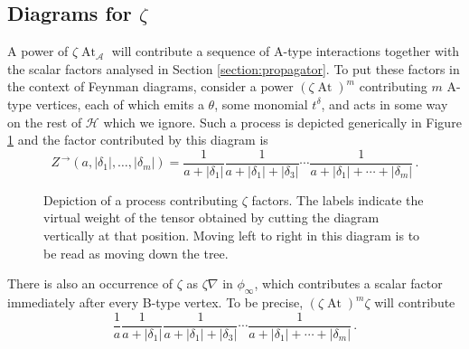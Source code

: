 \documentclass[english,letter paper,12pt,leqno]{article}
\theoremstyle{example}
\numberwithin{equation}{section}
\def\AA{\mathcal{A}}
\def\HH{\HH}
\def\HH{\mathcal{H}}
\def\be{\begin{equation}}
\def\ee{\end{equation}}
\DeclareMathOperator{\vAt}{At}
\begin{document}
\subsection{Diagrams for $\zeta$}\label{section:fenyman_diagram_2}

A power of $\zeta \vAt_{\AA}$ will contribute a sequence of A-type interactions together with the scalar factors analysed in Section \ref{section:propagator}. To put these factors in the context of Feynman diagrams, consider a power $(\zeta \vAt)^m$ contributing $m$ A-type vertices, each of which emits a $\theta$, some monomial $t^\delta$, and acts in some way on the rest of $\HH$ which we ignore. Such a process is depicted generically in Figure \ref{fig:tapesofU} and the factor contributed by this diagram is
\be\label{eq:diagram_for_zeta_eq}
Z^{\,\rightarrow}(a,|\delta_1|,\ldots,|\delta_m|) = \frac{1}{a + |\delta_1|} \frac{1}{a + |\delta_1| + |\delta_3|} \cdots \frac{1}{a + |\delta_1| + \cdots + |\delta_m|}\,.
\ee
\begin{figure}
\centering
\caption{Depiction of a process contributing $\zeta$ factors. The labels indicate the virtual weight of the tensor obtained by cutting the diagram vertically at that position. Moving left to right in this diagram is to be read as moving down the tree.}\label{fig:tapesofU}
\end{figure}
There is also an occurrence of $\zeta$ as $\zeta \nabla$ in $\phi_\infty$, which contributes a scalar factor immediately after every B-type vertex. To be precise, $(\zeta \vAt)^m \zeta$ will contribute
\be\label{eq:diagram_for_zeta_eq_b}
\frac{1}{a} \frac{1}{a + |\delta_1|} \frac{1}{a + |\delta_1| + |\delta_3|} \cdots \frac{1}{a + |\delta_1| + \cdots + |\delta_m|}\,.
\ee
\end{document}
